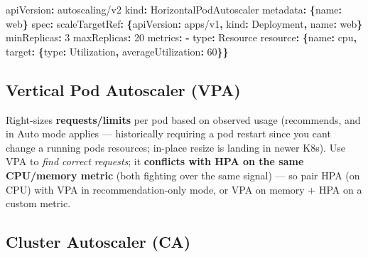 \documentclass[11pt]{article}
\newenvironment{Shaded}{\begin{snugshade}}{\end{snugshade}}
\newcommand{\AttributeTok}[1]{\textcolor[rgb]{0.16,0.50,0.73}{#1}}
\newcommand{\DecValTok}[1]{\textcolor[rgb]{0.96,0.45,0.00}{#1}}
\newcommand{\FunctionTok}[1]{\textcolor[rgb]{0.56,0.27,0.68}{#1}}
\newcommand{\KeywordTok}[1]{\textcolor[rgb]{0.81,0.81,0.76}{\textbf{#1}}}
\begin{document}
\begin{Shaded}
\begin{Highlighting}[]
\FunctionTok{apiVersion}\KeywordTok{:}\AttributeTok{ autoscaling/v2}
\FunctionTok{kind}\KeywordTok{:}\AttributeTok{ HorizontalPodAutoscaler}
\FunctionTok{metadata}\KeywordTok{:}\AttributeTok{ }\KeywordTok{\{}\FunctionTok{name}\KeywordTok{:}\AttributeTok{ web}\KeywordTok{\}}
\FunctionTok{spec}\KeywordTok{:}
\AttributeTok{  }\FunctionTok{scaleTargetRef}\KeywordTok{:}\AttributeTok{ }\KeywordTok{\{}\FunctionTok{apiVersion}\KeywordTok{:}\AttributeTok{ apps/v1}\KeywordTok{,}\AttributeTok{ }\FunctionTok{kind}\KeywordTok{:}\AttributeTok{ Deployment}\KeywordTok{,}\AttributeTok{ }\FunctionTok{name}\KeywordTok{:}\AttributeTok{ web}\KeywordTok{\}}
\AttributeTok{  }\FunctionTok{minReplicas}\KeywordTok{:}\AttributeTok{ }\DecValTok{3}
\AttributeTok{  }\FunctionTok{maxReplicas}\KeywordTok{:}\AttributeTok{ }\DecValTok{20}
\AttributeTok{  }\FunctionTok{metrics}\KeywordTok{:}
\AttributeTok{    }\KeywordTok{{-}}\AttributeTok{ }\FunctionTok{type}\KeywordTok{:}\AttributeTok{ Resource}
\AttributeTok{      }\FunctionTok{resource}\KeywordTok{:}\AttributeTok{ }\KeywordTok{\{}\FunctionTok{name}\KeywordTok{:}\AttributeTok{ cpu}\KeywordTok{,}\AttributeTok{ }\FunctionTok{target}\KeywordTok{:}\AttributeTok{ }\KeywordTok{\{}\FunctionTok{type}\KeywordTok{:}\AttributeTok{ Utilization}\KeywordTok{,}\AttributeTok{ }\FunctionTok{averageUtilization}\KeywordTok{:}\AttributeTok{ }\DecValTok{60}\KeywordTok{\}\}}
\end{Highlighting}
\end{Shaded}

\subsection{Vertical Pod Autoscaler (VPA)}\label{vertical-pod-autoscaler-vpa}

Right-sizes \textbf{requests/limits} per pod based on observed usage (recommends, and in Auto mode applies --- historically requiring a pod restart since you can\textquotesingle t change a running pod\textquotesingle s resources; in-place resize is landing in newer K8s). Use VPA to \emph{find correct requests}; it \textbf{conflicts with HPA on the same CPU/memory metric} (both fighting over the same signal) --- so pair HPA (on CPU) with VPA in recommendation-only mode, or VPA on memory + HPA on a custom metric.

\subsection{Cluster Autoscaler (CA)}\label{cluster-autoscaler-ca}
\end{document}
